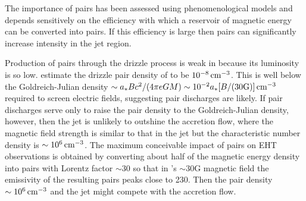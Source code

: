 The importance of pairs has been assessed using phenomenological models \citep{2020ApJ...896...30A, 2021arXiv210105327E} and depends sensitively on the efficiency with which a reservoir of magnetic energy can be converted into pairs.  If this efficiency is large then pairs can significantly increase intensity in the jet region.

Production of pairs through the drizzle process is weak in \sgra because its luminosity is so low.  \cite[][see also \citealt{2021ApJ...907...73W}]{2011ApJ...735....9M} estimate the drizzle pair density of \sgra to be $10^{-8}\,\mathrm{cm}^{-3}$.  This is well below the Goldreich-Julian density $\sim a_* B c^2/(4 \pi e G M) \sim 10^{-2} a_* [B/(30 {\rm G})] \,\mathrm{cm}^{-3}$ required to screen electric fields, suggesting pair discharges are likely.  If pair discharges serve only to raise the pair density to the Goldreich-Julian density, however, then the jet is unlikely to outshine the accretion flow, where the magnetic field strength is similar to that in the jet but the characteristic number density is $\sim 10^6 \,\mathrm{cm}^{-3}$.  The maximum conceivable impact of pairs on EHT observations is obtained by converting about half of the magnetic energy density into pairs with Lorentz factor $\sim 30$ so that in \sgra's $\sim 30$G magnetic field the emissivity of the resulting pairs peaks close to 230\GHz.  Then the pair density $\sim 10^{6} \,\mathrm{cm}^{-3}$ and the jet might compete with the accretion flow.




